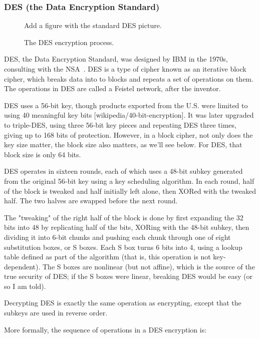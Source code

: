 \subsubsection{DES (the Data Encryption Standard)}

\begin{figure}
  {\color{Magenta} Add a figure with the standard DES picture.}
  \caption{The DES encryption process.}
  \label{fig:des}
\end{figure}

DES, the Data Encryption Standard, was designed by IBM in the 1970s,
consulting with the NSA~\cite{standard199946}.  DES is a type of cipher known as an
iterative block cipher, which breaks data into to blocks and repeats a
set of operations on them.  The operations in DES are called a Feistel
network, after the inventor.

DES uses a 56-bit key, though products exported from the U.S. were
limited to using 40 meaningful key bits [wikipedia/40-bit-encryption].
It was later upgraded to triple-DES, using three 56-bit key pieces and
repeating DES three times, giving up to 168 bits of protection.
However, in a block cipher, not only does the key size matter, the
block size also matters, as we'll see below.  For DES, that block size
is only 64 bits.

DES operates in sixteen rounds, each of which uses a 48-bit subkey
generated from the original 56-bit key using a key scheduling
algorithm.  In each round, half of the block is tweaked and half
initially left alone, then XORed with the tweaked half.  The two
halves are swapped before the next round.

The "tweaking" of the right half of the block is done by first
expanding the 32 bits into 48 by replicating half of the bits, XORing
with the 48-bit subkey, then dividing it into 6-bit chunks and pushing
each chunk through one of eight substitution boxes, or S boxes.  Each
S box turns 6 bits into 4, using a lookup table defined as part of the
algorithm (that is, this operation is not key-dependent).  \aono{} The S boxes
are nonlinear (but not affine), which is the source of the true
security of DES; if the S boxes were linear, breaking DES would be
easy (or so I am told).

Decrypting DES is exactly the same operation as encrypting, except
that the subkeys are used in reverse order.

More formally, the sequence of operations in a DES encryption
is:

